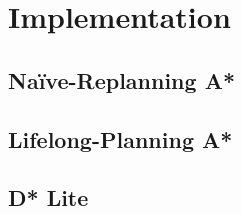 
\section{Implementation}

	

\subsection{Naïve-Replanning A*}


\subsection{Lifelong-Planning A*}


\subsection{D* Lite}

